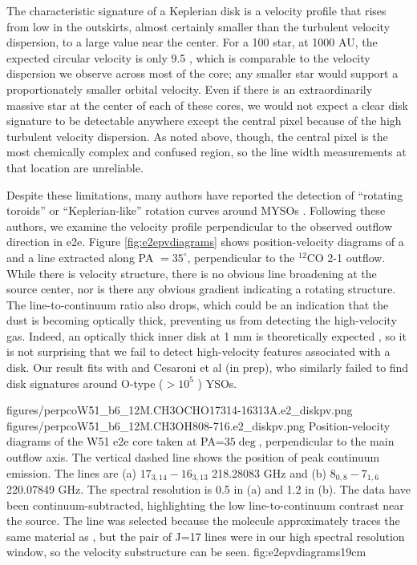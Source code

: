 \documentclass{emulateapj}
\begin{document}
The characteristic signature of a Keplerian disk is a velocity profile that
rises from low in the outskirts, almost certainly smaller than the turbulent
velocity dispersion, to a large value near the center.  For a 100 \msun star,
at 1000 AU, the expected circular velocity is only 9.5 \kms, which is comparable
to the velocity dispersion we observe across most of the core; any smaller
star would support a proportionately smaller orbital velocity.  Even if there
is an extraordinarily massive star at the center of each of these cores, we
would not expect a clear disk signature to be detectable anywhere except the
central pixel because of the high turbulent velocity dispersion.  As noted
above, though, the central pixel is the most chemically complex and confused
region, so the line width measurements at that location are unreliable.

Despite these limitations, many authors have reported the detection of
``rotating toroids'' or ``Keplerian-like'' rotation curves around MYSOs
\citep{Johnston2015a,Chen2016b,Ilee2016a,Zapata2015a,Hunter2014a,Sanchez-Monge2013a,Moscadelli2014a}.
Following these authors, we examine the velocity profile perpendicular to the
observed outflow direction in e2e.  Figure \ref{fig:e2epvdiagrams} shows
position-velocity diagrams of a \methanol and a \methylformate line extracted
along PA $=35^\circ$, perpendicular to the $^{12}$CO 2-1 outflow.
While there
is velocity structure, there is no obvious line broadening at the source
center, nor is there any obvious gradient indicating a rotating structure.  The
line-to-continuum ratio also drops, which could be an indication that the dust
is becoming optically thick, preventing us from detecting the
high-velocity gas.  Indeed, an optically thick inner disk at 1 mm is theoretically
expected \citep{Forgan2016a,Klassen2016a}, so it is not surprising that we fail
to detect high-velocity features associated with a disk.  Our result fits with
\citet{Maud2017a} and Cesaroni et al (in prep), who similarly failed to find
disk signatures around O-type ($>10^5$ \lsun) YSOs.

\FigureTwo
{figures/perpcoW51_b6_12M.CH3OCHO17314-16313A.e2_diskpv.png}
{figures/perpcoW51_b6_12M.CH3OH808-716.e2_diskpv.png}
{Position-velocity diagrams of the W51 e2e core taken at PA=$35\deg$,
perpendicular to the main outflow axis.  The vertical dashed line shows the
position of peak continuum emission. The lines are (a) \methylformate
$17_{3,14}-16_{3,13}$ 218.28083 GHz and (b) \methanol $8_{0,8}-7_{1,6}$
220.07849 GHz.  The spectral resolution is 0.5 \kms in (a) and 1.2 \kms in (b).
The data have been continuum-subtracted, highlighting the low line-to-continuum
contrast near the source.  The \methylformate line was selected because the
molecule approximately traces the same material as \methanol, but the pair of
\methylformate J=17 lines were in our high spectral resolution window, so the
velocity substructure can be seen.
}
{fig:e2epvdiagrams}{1}{9cm}
\end{document}
